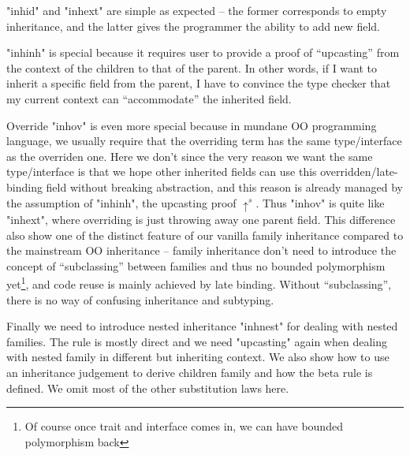"inhid" and "inhext" are simple as expected -- the former corresponds to empty inheritance, and the latter gives the programmer the ability to add new field. 

"inhinh" is special because it requires user to provide a proof of ``upcasting'' from the context of the children to that of the parent. In other words, if I want to inherit a specific field from the parent, I have to convince the type checker that my current context can ``accommodate'' the inherited field. 

Override "inhov" is even more special because in mundane OO programming language, we usually require that the overriding term has the same type/interface as the overriden one.  Here we don't since the very reason we want the same type/interface is that we hope other inherited fields can use this overridden/late-binding field without breaking abstraction, and this reason is already managed by the assumption of "inhinh", the upcasting proof $\uparrow^s$. Thus "inhov" is quite like "inhext", where overriding is just throwing away one parent field. This difference also show one of the distinct feature of our vanilla family inheritance compared to the mainstream OO inheritance -- family inheritance don't need to introduce the concept of ``subclassing'' between families and thus no bounded polymorphism yet\footnote{Of course once trait and interface comes in, we can have bounded polymorphism back}, and code reuse is mainly achieved by late binding. Without ``subclassing'', there is no way of confusing inheritance and subtyping.

Finally we need to introduce nested inheritance "inhnest" for dealing with nested families. The rule is mostly direct and we need "upcasting" again when dealing with nested family in different but inheriting context.  We also show how to use an inheritance judgement to derive children family and how the beta rule is defined. We omit most of the other substitution laws here.




